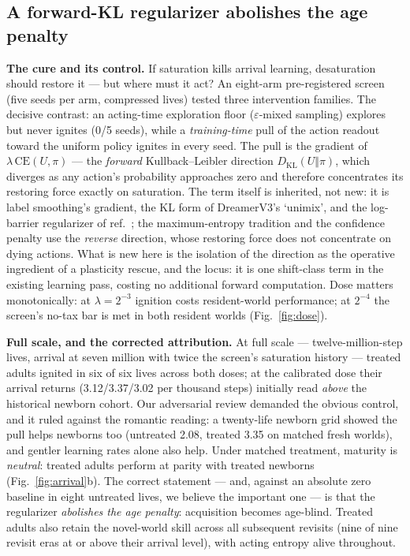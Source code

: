 \documentclass[sn-nature]{sn-jnl}
\begin{document}
\subsection*{A forward-KL regularizer abolishes the age penalty}

\textbf{The cure and its control.} If saturation kills arrival learning,
desaturation should restore it --- but where must it act? An eight-arm
pre-registered screen (five seeds per arm, compressed lives) tested three
intervention families. The decisive contrast: an acting-time exploration
floor ($\varepsilon$-mixed sampling) explores but never ignites (0/5 seeds),
while a \emph{training-time} pull of the action readout toward the uniform
policy ignites in every seed. The pull is the gradient of
$\lambda\,\mathrm{CE}(U,\pi)$ --- the \emph{forward}
Kullback--Leibler direction $D_{\mathrm{KL}}(U\Vert\pi)$, which diverges as
any action's probability approaches zero and therefore concentrates its
restoring force exactly on saturation. The term itself is inherited, not
new: it is label smoothing's gradient\cite{szegedy2016}, the KL form of
DreamerV3's `unimix'\cite{hafner2023dreamer}, and the log-barrier
regularizer of ref.~; the maximum-entropy
tradition\cite{ziebart2008,haarnoja2018sac} and the confidence
penalty\cite{pereyra2017} use the \emph{reverse} direction, whose
restoring force does not concentrate on dying
actions\cite{meister2020}. What is new here is the isolation of the
direction as the operative ingredient of a plasticity rescue, and the
locus: it is one shift-class term in the existing learning pass, costing
no additional forward computation. Dose
matters monotonically: at $\lambda=2^{-3}$ ignition costs resident-world
performance; at $2^{-4}$ the screen's no-tax bar is met in both resident
worlds (Fig.~\ref{fig:dose}).

\textbf{Full scale, and the corrected attribution.} At full scale ---
twelve-million-step lives, arrival at seven million with twice the screen's
saturation history --- treated adults ignited in six of six lives across
both doses; at the calibrated dose their arrival returns (3.12/3.37/3.02
per thousand steps) initially read \emph{above} the historical newborn
cohort. Our adversarial review demanded the obvious control, and it ruled
against the romantic reading: a twenty-life newborn grid showed the pull
helps newborns too (untreated 2.08, treated 3.35 on matched fresh worlds),
and gentler learning rates alone also help. Under matched treatment,
maturity is \emph{neutral}: treated adults perform at parity with treated
newborns (Fig.~\ref{fig:arrival}b). The correct statement --- and, against
an absolute zero baseline in eight untreated lives, we believe the important
one --- is that the regularizer \emph{abolishes the age penalty}: acquisition
becomes age-blind. Treated adults also retain the novel-world skill across
all subsequent revisits (nine of nine revisit eras at or above their arrival
level), with acting entropy alive throughout.
\end{document}
